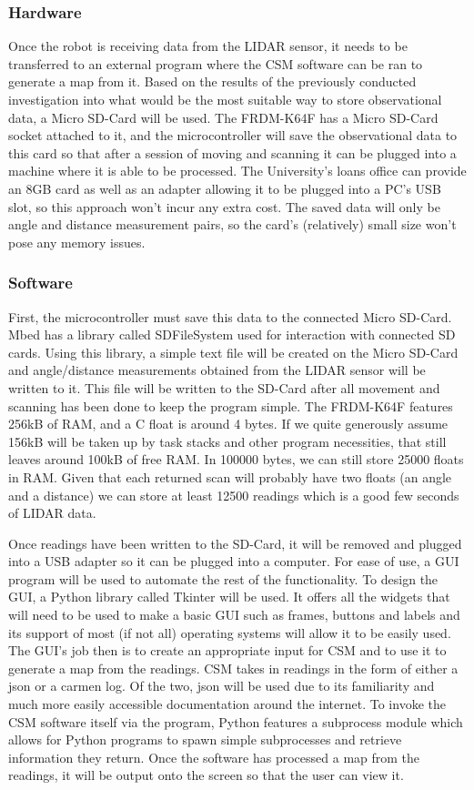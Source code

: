 				\subsubsection{Hardware}
				Once the robot is receiving data from the LIDAR sensor, it needs to be transferred to an external program where the CSM software can be ran to generate a map from it. Based on the results of the previously conducted investigation into what would be the most suitable way to store observational data, a Micro SD-Card will be used. The FRDM-K64F has a Micro SD-Card socket attached to it, and the microcontroller will save the observational data to this card so that after a session of moving and scanning it can be plugged into a machine where it is able to be processed. The University's loans office can provide an 8GB card as well as an adapter allowing it to be plugged into a PC's USB slot, so this approach won't incur any extra cost. The saved data will only be angle and distance measurement pairs, so the card's (relatively) small size won't pose any memory issues. 
				
				\subsubsection{Software}
				First, the microcontroller must save this data to the connected Micro SD-Card. Mbed has a library called SDFileSystem used for interaction with connected SD cards. Using this library, a simple text file will be created on the Micro SD-Card and angle/distance measurements obtained from the LIDAR sensor will be written to it. This file will be written to the SD-Card after all movement and scanning has been done to keep the program simple. The FRDM-K64F features 256kB of RAM, and a C float is around 4 bytes. If we quite generously assume 156kB will be taken up by task stacks and other program necessities, that still leaves around 100kB of free RAM. In 100000 bytes, we can still store 25000 floats in RAM. Given that each returned scan will probably have two floats (an angle and a distance) we can store at least 12500 readings which is a good few seconds of LIDAR data.
				
				Once readings have been written to the SD-Card, it will be removed and plugged into a USB adapter so it can be plugged into a computer. For ease of use, a GUI program will be used to automate the rest of the functionality. To design the GUI, a Python library called Tkinter will be used. It offers all the widgets that will need to be used to make a basic GUI such as frames, buttons and labels and its support of most (if not all) operating systems will allow it to be easily used. The GUI's job then is to create an appropriate input for CSM and to use it to generate a map from the readings. CSM takes in readings in the form of either a json or a carmen log. Of the two, json will be used due to its familiarity and much more easily accessible documentation around the internet. To invoke the CSM software itself via the program, Python features a subprocess module which allows for Python programs to spawn simple subprocesses and retrieve information they return. Once the software has processed a map from the readings, it will be output onto the screen so that the user can view it.
		\newpage
